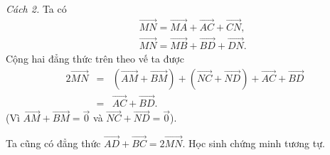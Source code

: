 \begin{vd}
{{
		}
		\noindent\textit{Cách 2.} Ta có
		\begin{eqnarray*}
			&&\overrightarrow {MN}= \overrightarrow {MA}  +  \overrightarrow{AC}  +  \overrightarrow{CN},\\
			&&\overrightarrow {MN}= \overrightarrow {MB}  +  \overrightarrow{BD}  +  \overrightarrow{DN}.
		\end{eqnarray*}
		Cộng hai đẳng thức trên theo vế ta được
		\allowdisplaybreaks
		\begin{eqnarray*}
			2 \overrightarrow {MN}  &=&  \left( \overrightarrow {AM}  +  \overrightarrow{BM}\right)  +  \left( \overrightarrow {NC}  +  \overrightarrow{ND}\right)  +  \overrightarrow{AC}  +  \overrightarrow{BD} \\
			&=&  \overrightarrow{AC}  +  \overrightarrow{BD}.
		\end{eqnarray*}
		(Vì $ \overrightarrow {AM} + \overrightarrow {BM}=  \overrightarrow{0}$ và $ \overrightarrow {NC}+ \overrightarrow {ND}= \overrightarrow{0}$).\\
		\begin{note} Ta cũng có đẳng thức
			$ \overrightarrow {AD} + \overrightarrow{BC}=2 \overrightarrow {MN}$. Học sinh chứng minh tương tự.
		\end{note}

	}
\end{vd}


